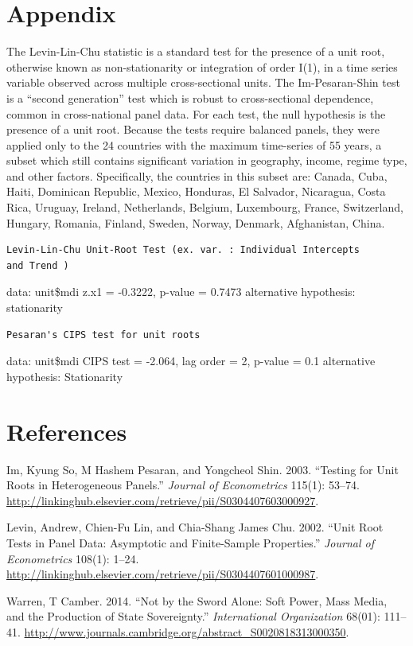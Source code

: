 \documentclass[11pt,article,oneside]{memoir}
\begin{document}
\section{Appendix}\label{appendix}

The Levin-Lin-Chu statistic is a standard test for the presence of a
unit root, otherwise known as non-stationarity or integration of order
I(1), in a time series variable observed across multiple cross-sectional
units. The Im-Pesaran-Shin test is a ``second generation'' test which is
robust to cross-sectional dependence, common in cross-national panel
data. For each test, the null hypothesis is the presence of a unit root.
Because the tests require balanced panels, they were applied only to the
24 countries with the maximum time-series of 55 years, a subset which
still contains significant variation in geography, income, regime type,
and other factors. Specifically, the countries in this subset are:
Canada, Cuba, Haiti, Dominican Republic, Mexico, Honduras, El Salvador,
Nicaragua, Costa Rica, Uruguay, Ireland, Netherlands, Belgium,
Luxembourg, France, Switzerland, Hungary, Romania, Finland, Sweden,
Norway, Denmark, Afghanistan, China.

\begin{verbatim}
Levin-Lin-Chu Unit-Root Test (ex. var. : Individual Intercepts
and Trend )
\end{verbatim}

data: unit\$mdi z.x1 = -0.3222, p-value = 0.7473 alternative hypothesis:
stationarity

\begin{verbatim}
Pesaran's CIPS test for unit roots
\end{verbatim}

data: unit\$mdi CIPS test = -2.064, lag order = 2, p-value = 0.1
alternative hypothesis: Stationarity

\pagebreak   

\section*{References}\label{references}

\setlength{\parindent}{-0.2in} \setlength{\leftskip}{0.2in}
\setlength{\parskip}{8pt} \vspace*{-0.2in} \noindent

Im, Kyung So, M Hashem Pesaran, and Yongcheol Shin. 2003. ``Testing for
Unit Roots in Heterogeneous Panels.'' \emph{Journal of Econometrics}
115(1): 53--74.
\url{http://linkinghub.elsevier.com/retrieve/pii/S0304407603000927}.

Levin, Andrew, Chien-Fu Lin, and Chia-Shang James Chu. 2002. ``Unit Root
Tests in Panel Data: Asymptotic and Finite-Sample Properties.''
\emph{Journal of Econometrics} 108(1): 1--24.
\url{http://linkinghub.elsevier.com/retrieve/pii/S0304407601000987}.

Warren, T Camber. 2014. ``Not by the Sword Alone: Soft Power, Mass
Media, and the Production of State Sovereignty.'' \emph{International
Organization} 68(01): 111--41.
\url{http://www.journals.cambridge.org/abstract_S0020818313000350}.
\end{document}

